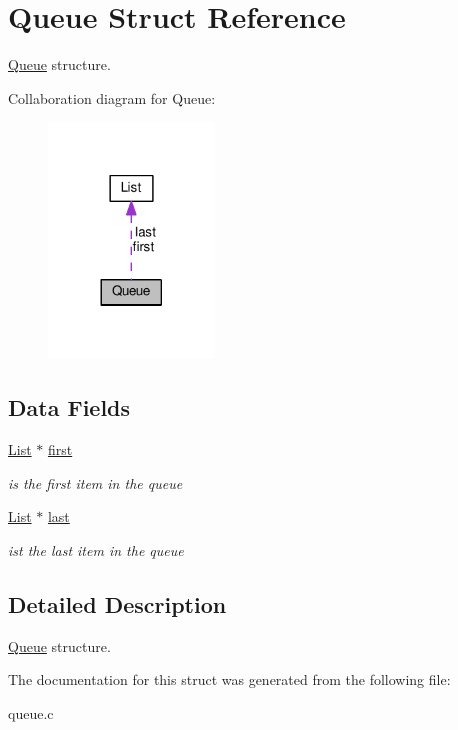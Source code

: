 \hypertarget{structQueue}{}\section{Queue Struct Reference}
\label{structQueue}


\hyperlink{structQueue}{Queue} structure.  




Collaboration diagram for Queue\+:\nopagebreak
\begin{figure}[H]
\begin{center}
\leavevmode
\includegraphics[width=125pt]{structQueue__coll__graph}
\end{center}
\end{figure}
\subsection*{Data Fields}
\begin{DoxyCompactItemize}
\item 
\mbox{\label{structQueue_af96a7f51b3f94c84d68a4276e1dbcd18}} 
\hyperlink{structList}{List} $\ast$ \hyperlink{structQueue_af96a7f51b3f94c84d68a4276e1dbcd18}{first}
\begin{DoxyCompactList}\small\item\em is the first item in the queue \end{DoxyCompactList}\item 
\mbox{\label{structQueue_a231fb3dbe3dc62e5f5ddc97451a91766}} 
\hyperlink{structList}{List} $\ast$ \hyperlink{structQueue_a231fb3dbe3dc62e5f5ddc97451a91766}{last}
\begin{DoxyCompactList}\small\item\em ist the last item in the queue \end{DoxyCompactList}\end{DoxyCompactItemize}


\subsection{Detailed Description}
\hyperlink{structQueue}{Queue} structure. 

The documentation for this struct was generated from the following file\+:\begin{DoxyCompactItemize}
\item 
queue.\+c\end{DoxyCompactItemize}

